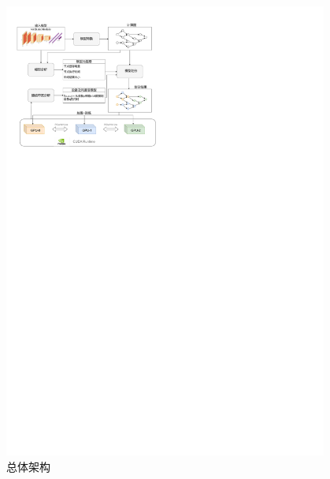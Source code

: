 \begin{figure}[h]
	\centering
	\includegraphics[width=0.95\textwidth]{figure/3-system/arch2.pdf}
	\caption{\sys{} 总体架构}
	\label{fig:arch}
\end{figure}


